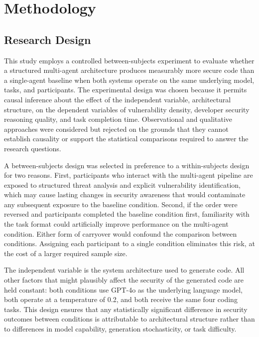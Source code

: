 
\section{Methodology}

\subsection{Research Design}

This study employs a controlled between-subjects experiment to evaluate whether a structured multi-agent architecture produces measurably more secure code than a single-agent baseline when both systems operate on the same underlying model, tasks, and participants. The experimental design was chosen because it permits causal inference about the effect of the independent variable, architectural structure, on the dependent variables of vulnerability density, developer security reasoning quality, and task completion time. Observational and qualitative approaches were considered but rejected on the grounds that they cannot establish causality or support the statistical comparisons required to answer the research questions.

A between-subjects design was selected in preference to a within-subjects design for two reasons. First, participants who interact with the multi-agent pipeline are exposed to structured threat analysis and explicit vulnerability identification, which may cause lasting changes in security awareness that would contaminate any subsequent exposure to the baseline condition. Second, if the order were reversed and participants completed the baseline condition first, familiarity with the task format could artificially improve performance on the multi-agent condition. Either form of carryover would confound the comparison between conditions. Assigning each participant to a single condition eliminates this risk, at the cost of a larger required sample size.

The independent variable is the system architecture used to generate code. All other factors that might plausibly affect the security of the generated code are held constant: both conditions use GPT-4o as the underlying language model, both operate at a temperature of 0.2, and both receive the same four coding tasks. This design ensures that any statistically significant difference in security outcomes between conditions is attributable to architectural structure rather than to differences in model capability, generation stochasticity, or task difficulty.

